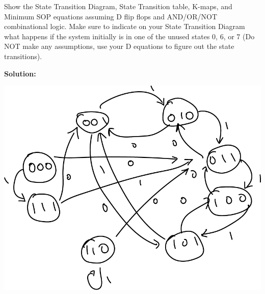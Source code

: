 \documentclass{article}
\begin{document}
    Show the State Transition Diagram, State Transition table, K-maps, and Minimum SOP 
    equations assuming D flip flops and AND/OR/NOT combinational logic. Make sure to 
    indicate on your State Transition Diagram what happens if the system initially is in 
    one of the unused states 0, 6, or 7 (Do NOT make any assumptions, use your D 
    equations to figure out the state transitions).

    \textbf{Solution:}

    \begin{center}
        \includegraphics[scale=0.3]{Q3_State_Diagram.png}
    \end{center}
\end{document}
